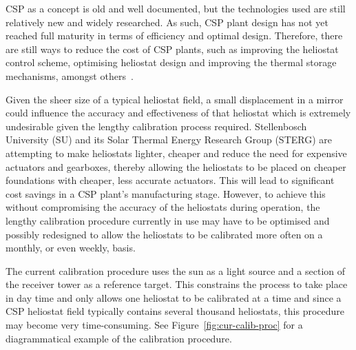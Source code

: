 CSP as a concept is old and well documented, but the technologies used are still relatively new and widely researched. As such, CSP plant design has not yet reached full maturity in terms of efficiency and optimal design. Therefore, there are still ways to reduce the cost of CSP plants, such as improving the heliostat control scheme, optimising heliostat design and improving the thermal storage mechanisms, amongst others~\citep{irena-cost_reduction}.  

Given the sheer size of a typical heliostat field, a small displacement in a mirror could influence the accuracy and effectiveness of that heliostat which is extremely undesirable given the lengthy calibration process required. Stellenbosch University (SU) and its Solar Thermal Energy Research Group (STERG) are attempting to make heliostats lighter, cheaper and reduce the need for expensive actuators and gearboxes, thereby allowing the heliostats to be placed on cheaper foundations with cheaper, less accurate actuators. This will lead to significant cost savings in a CSP plant's manufacturing stage. However, to achieve this without compromising the accuracy of the heliostats during operation, the lengthy calibration procedure currently in use may have to be optimised and possibly redesigned to allow the heliostats to be calibrated more often on a monthly, or even weekly, basis.

The current calibration procedure uses the sun as a light source and a section of the receiver tower as a reference target. This constrains the process to take place in day time and only allows one heliostat to be calibrated at a time and since a CSP heliostat field typically contains several thousand heliostats, this procedure may become very time-consuming. See Figure~\ref{fig:cur-calib-proc} for a diagrammatical example of the calibration procedure.

